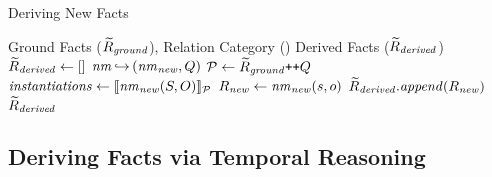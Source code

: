 {
\begin{algorithm}[!h]
\caption{Deriving New Facts}
\label{alg:logic_reasoning}
\small
\begin{algorithmic}[1]
\Require Ground Facts ($\widetilde{R}_{\mathit{ground}}$), Relation Category (\relationCat)
\Ensure Derived Facts ($\widetilde{R}_{\mathit{derived}}$)
\State $\widetilde{R}_{\mathit{derived}} \gets []$ 
\State $\mathit{nm}\,{\hookrightarrow}\,(\mathit{nm}_{\mathit{new}}, {Q})$ %
\State $\mathcal{P} \gets \widetilde{R}_{\mathit{ground}}\texttt{+}\texttt{+}{Q}$  
\State $\mathit{instantiations} \gets \llbracket \mathit{nm}_{\mathit{new}}(S, O)\rrbracket_{\mathcal{P}}$ 
\State $R_{\mathit{new}} \gets \mathit{nm}_{\mathit{new}}(s, o)$ 
\State $\widetilde{R}_{\mathit{derived}}.\mathit{append}(R_{\mathit{new}})$ 
\EndFor
\EndFor
\State \Return $\widetilde{R}_{\mathit{derived}}$ 
\EndFunction 
\end{algorithmic}
\end{algorithm}
}






\vspace{-2mm}
\subsection{Deriving Facts via Temporal Reasoning}
\label{sec:encoding_MTL}





